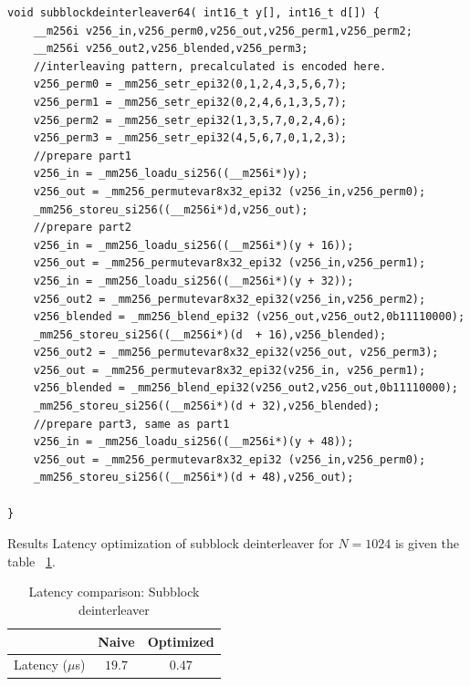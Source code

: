 \begin{code}
\label{code:subblockDeinterleaver}
\begin{verbatim}
void subblockdeinterleaver64( int16_t y[], int16_t d[]) {
	__m256i v256_in,v256_perm0,v256_out,v256_perm1,v256_perm2;
	__m256i v256_out2,v256_blended,v256_perm3;
	//interleaving pattern, precalculated is encoded here.
	v256_perm0 = _mm256_setr_epi32(0,1,2,4,3,5,6,7);
	v256_perm1 = _mm256_setr_epi32(0,2,4,6,1,3,5,7);
	v256_perm2 = _mm256_setr_epi32(1,3,5,7,0,2,4,6);
	v256_perm3 = _mm256_setr_epi32(4,5,6,7,0,1,2,3);
	//prepare part1
	v256_in = _mm256_loadu_si256((__m256i*)y);
	v256_out = _mm256_permutevar8x32_epi32 (v256_in,v256_perm0);
	_mm256_storeu_si256((__m256i*)d,v256_out);
	//prepare part2
	v256_in = _mm256_loadu_si256((__m256i*)(y + 16));
	v256_out = _mm256_permutevar8x32_epi32 (v256_in,v256_perm1);
	v256_in = _mm256_loadu_si256((__m256i*)(y + 32));
	v256_out2 = _mm256_permutevar8x32_epi32(v256_in,v256_perm2);
	v256_blended = _mm256_blend_epi32 (v256_out,v256_out2,0b11110000);
	_mm256_storeu_si256((__m256i*)(d  + 16),v256_blended);
	v256_out2 = _mm256_permutevar8x32_epi32(v256_out, v256_perm3);
	v256_out = _mm256_permutevar8x32_epi32(v256_in, v256_perm1);
	v256_blended = _mm256_blend_epi32(v256_out2,v256_out,0b11110000);
	_mm256_storeu_si256((__m256i*)(d + 32),v256_blended);
	//prepare part3, same as part1
	v256_in = _mm256_loadu_si256((__m256i*)(y + 48));
	v256_out = _mm256_permutevar8x32_epi32 (v256_in,v256_perm0);
	_mm256_storeu_si256((__m256i*)(d + 48),v256_out);
		
}
\end{verbatim}
\end{code}

Results Latency optimization of subblock deinterleaver for $N = 1024$ is given the table ~\ref{tab:subblockDeinterleaverLatency}.
\begin{table}[!h]
	\begin{center}
		\caption{Latency comparison: Subblock deinterleaver}
		\label{tab:subblockDeinterleaverLatency}
		\begin{tabular}{c|c|c} %
			\textbf{ } & Naive & Optimized \\
			\hline
			Latency ($\mu$s) & $19.7$ & $0.47$\\
		\end{tabular}
	\end{center}
\end{table}

